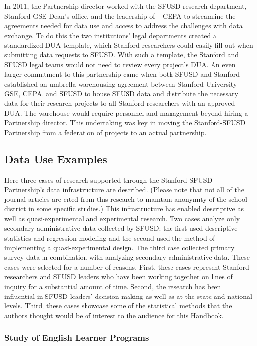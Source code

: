 \documentclass[
]{book}
\begin{document}
In 2011, the Partnership director worked with the SFUSD research department, Stanford GSE Dean's office, and the leadership of +CEPA\textbar{} to streamline the agreements needed for data use and access to address the challenges with data exchange. To do this the two institutions' legal departments created a standardized DUA template, which Stanford researchers could easily fill out when submitting data requests to SFUSD. With such a template, the Stanford and SFUSD legal teams would not need to review every project's DUA. An even larger commitment to this partnership came when both SFUSD and Stanford established an umbrella warehousing agreement between Stanford University GSE, CEPA, and SFUSD to house SFUSD data and distribute the necessary data for their research projects to all Stanford researchers with an approved DUA. The warehouse would require personnel and management beyond hiring a Partnership director. This undertaking was key in moving the Stanford-SFUSD Partnership from a federation of projects to an actual partnership.

\hypertarget{data-use-examples-5}{%
\subsection{Data Use Examples}\label{data-use-examples-5}}

Here three cases of research supported through the Stanford-SFUSD Partnership's data infrastructure are described. (Please note that not all of the journal articles are cited from this research to maintain anonymity of the school district in some specific studies.) This infrastructure has enabled descriptive as well as quasi-experimental and experimental research. Two cases analyze only secondary administrative data collected by SFUSD: the first used descriptive statistics and regression modeling and the second used the method of implementing a quasi-experimental design. The third case collected primary survey data in combination with analyzing secondary administrative data. These cases were selected for a number of reasons. First, these cases represent Stanford researchers and SFUSD leaders who have been working together on lines of inquiry for a substantial amount of time. Second, the research has been influential in SFUSD leaders' decision-making as well as at the state and national levels. Third, these cases showcase some of the statistical methods that the authors thought would be of interest to the audience for this Handbook.

\hypertarget{study-of-english-learner-programs}{%
\subsubsection*{Study of English Learner Programs}\label{study-of-english-learner-programs}}
\end{document}
